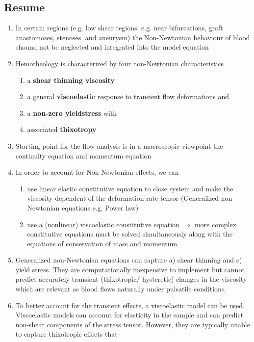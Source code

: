 \documentclass[11pt,letterpaper]{article}
\begin{document}
\subsection*{Resume}
\begin{enumerate}
    \item In certain regions (e.g. low shear regions: e.g. near bifurcations, graft anastomoses, stenoses, and  aneurysm) the Non-Newtonian behaviour of blood shound not be neglected and integrated into the model equation
    \item Hemorheology is characterized by 
four non-Newtonian characteristics 
\begin{enumerate}
 \item a \textbf{shear thinning viscosity}
 \item a general \textbf{viscoelastic} response to transient flow deformations and 
 \item a \textbf{non-zero yieldstress} with
 \item associated \textbf{thixotropy}
\end{enumerate}
    \item Starting point for the flow analysis is in a macroscopic viewpoint the continuity equation and momentum equation
    \item In order to account for Non-Newtonian effects, we can\begin{enumerate}
        \item use linear elastic constitutive equation to close system and make the viscosity dependent of the deformation rate tensor (Generalized non-Newtonian equations e.g. Power law)
        \item use a (nonlinear) viscoelastic constitutive equation $\Rightarrow$ more complex constitutive equations must be solved simultaneously along with the equations of conservation of mass and momentum.
    \end{enumerate}  
\item  Generalized non-Newtonian equations can capture a) shear thinning and c) yield stress. They are computationally inexpensive
to implement but cannot predict accurately transient (thixotropic/
hysteretic) changes in the viscosity which are relevant as blood
flows naturally under pulsatile conditions.
\item To better account for
the transient effects, a viscoelastic model can be used. 
Viscoelastic models can account for elasticity in the sample
and can predict non-shear components of the stress tensor. However, they are typically unable to capture thixotropic effects that

\end{enumerate}
\end{document}
